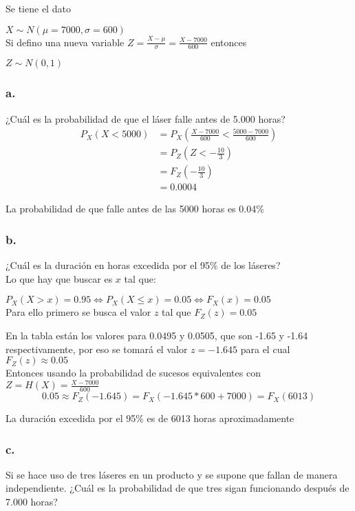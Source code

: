 \documentclass[12pt,fleqn]{article}
\begin{document}
Se tiene el dato

$X \sim N(\mu=7000,\sigma=600)$\\

Si defino una nueva variable $Z=\frac{X-\mu}{\sigma}=\frac{X-7000}{600}$ entonces

$Z \sim N(0,1)$
\subsubsection*{a.} ¿Cuál es la probabilidad de que el láser falle antes de 5.000 horas?
\begin{align*}
  P_X(X<5000)&=P_X(\frac{X-7000}{600}<\frac{5000-7000}{600})\\
           &=P_Z(Z<-\frac{10}{3})\tag{Probabilidad de sucesos equivalentes}\\
           &=F_Z(-\frac{10}{3})\\
           &=0.0004\tag{Tabla de distribución normal estandarizada}
\end{align*}

La probabilidad de que falle antes de las 5000 horas es 0.04\%
\subsubsection*{b.} ¿Cuál es la duración en horas excedida por el 95\% de los láseres?\\

Lo que hay que buscar es $x$ tal que:

$P_X(X>x)=0.95 \iff P_X(X\le x)=0.05 \iff F_X(x)=0.05$\\

Para ello primero se busca el valor $z$ tal que $F_Z(z)=0.05$

En la tabla están los valores para 0.0495 y 0.0505, que son -1.65 y -1.64 respectivamente, por eso se tomará el valor $z=-1.645$ para el cual $F_Z(z)\approx 0.05$\\

Entonces usando la probabilidad de sucesos equivalentes con $Z=H(X)=\frac{X-7000}{600}$
\[0.05 \approx F_Z(-1.645)=F_X(-1.645*600+7000)=F_X(6013)\]

La duración excedida por el 95\% es de 6013 horas aproximadamente
\newpage
\subsubsection*{c.} Si se hace uso de tres láseres en un producto y se supone que fallan de manera independiente. ¿Cuál es la probabilidad de que tres sigan funcionando después de 7.000 horas?\\
\end{document}
